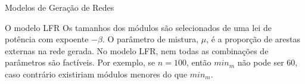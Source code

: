 \begin{section}{Modelos de Geração de Redes}
\begin{subsection}{O modelo LFR}
Os tamanhos dos módulos são selecionados de uma lei de potência com expoente $-\beta$. O parâmetro de mistura, $\mu$, é a proporção de arestas externas na rede gerada. No modelo LFR, nem todas as combinações de parâmetros são factíveis. Por exemplo, se $n = 100$, então $min_m$ não pode ser 60, caso contrário existiriam módulos menores do que $min_m$.

	

\end{subsection}

\end{section}

